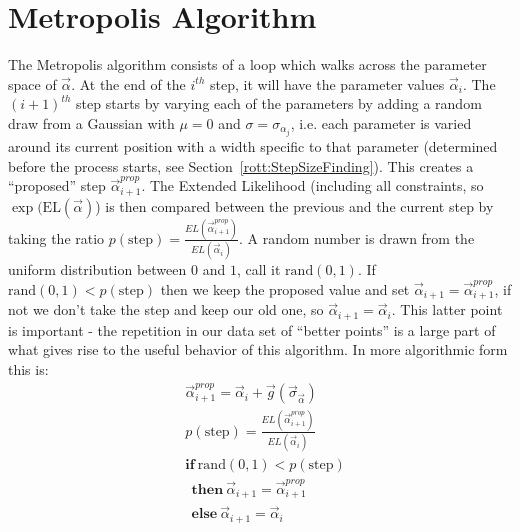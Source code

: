 \section{Metropolis Algorithm}
The Metropolis algorithm consists of a loop which walks across the
parameter space of $\vec{\alpha}$.  At the end of the $i^{th}$ step,
it will have the parameter values $\vec{\alpha}_i$.  The $(i+1)^{th}$
step starts by varying each of the parameters by adding a random draw
from a Gaussian with $\mu=0$ and $\sigma=\sigma_{\alpha_j}$, i.e. each
parameter is varied around its current position with a width specific
to that parameter (determined before the process starts, see
\mbox{Section \ref{rott:StepSizeFinding}}).  This creates a
``proposed'' step $\vec{\alpha}_{i+1}^{prop}$.  The Extended
Likelihood (including all constraints, so
$\exp(\mathrm{EL}(\vec{\alpha})$) is then compared between the
previous and the current step by taking the ratio $\displaystyle
p(\mathrm{step}) =
\frac{EL(\vec{\alpha}_{i+1}^{prop})}{EL(\vec{\alpha}_i)}$.  A random
number is drawn from the uniform distribution between $0$ and $1$,
call it $\mathrm{rand}(0,1)$.  If $\mathrm{rand}(0,1) <
p(\mathrm{step})$ then we keep the proposed value and set
$\vec{\alpha}_{i+1} = \vec{\alpha}_{i+1}^{prop}$, if not we don't take
the step and keep our old one, so $\vec{\alpha}_{i+1} =
\vec{\alpha}_i$.  This latter point is important - the repetition in
our data set of ``better points'' is a large part of what gives rise
to the useful behavior of this algorithm.  In more algorithmic form
this is:
\begin{equation*}
\begin{split}
& \vec{\alpha}_{i+1}^{prop} = \vec{\alpha}_i + 
\vec{g}(\vec{\sigma}_{\vec{\alpha}})\\
& p(\mathrm{step}) = \frac{EL(\vec{\alpha}_{i+1}^{prop})}
{EL(\vec{\alpha}_i)}\\
& \mathbf{if}\ \mathrm{rand}(0,1) < p(\mathrm{step})\\
& \ \ \mathbf{then}\ \vec{\alpha}_{i+1} = \vec{\alpha}_{i+1}^{prop}\\
& \ \ \mathbf{else}\ \vec{\alpha}_{i+1} = \vec{\alpha}_i
\end{split}
\end{equation*}

